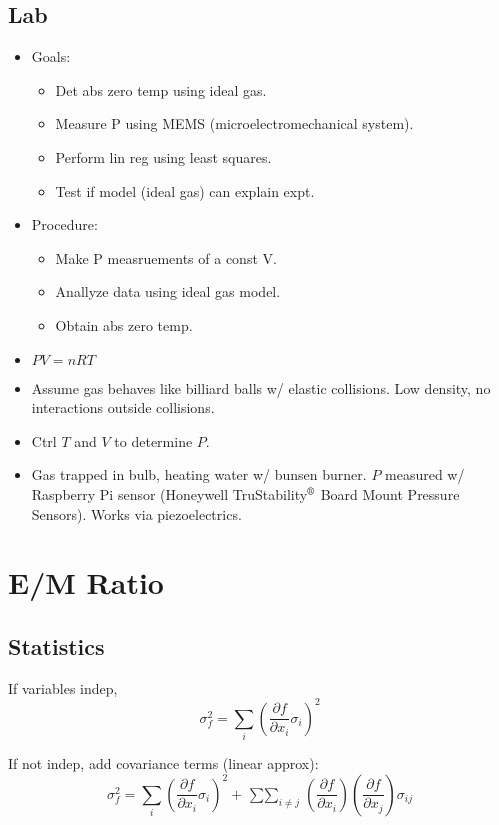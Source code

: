 \documentclass[twocolumn]{article}
\begin{document}
\subsection{Lab}

\begin{itemize}
    \item Goals:
    \begin{itemize}
        \item Det abs zero temp using ideal gas.
        \item Measure P using MEMS (microelectromechanical system).
        \item Perform lin reg using least squares.
        \item Test if model (ideal gas) can explain expt.
    \end{itemize}
    \item Procedure:
    \begin{itemize}
        \item Make P measruements of a const V.
        \item Anallyze data using ideal gas model.
        \item Obtain abs zero temp.
    \end{itemize}
    \item $PV = nRT$
    \item Assume gas behaves like billiard balls w/ elastic collisions. Low density, no interactions outside collisions.
    \item Ctrl $T$ and $V$ to determine $P$.
    \item Gas trapped in bulb, heating water w/ bunsen burner. $P$ measured w/ Raspberry Pi sensor (Honeywell TruStability$^\text{\textregistered}$ Board Mount Pressure Sensors). Works via piezoelectrics.
\end{itemize}


\section{E/M Ratio}

\subsection{Statistics}
If variables indep,
\begin{equation*}
    \sigma_f^2 = \sum_i \left( \frac{\partial f}{\partial x_i} \sigma_i \right)^2
\end{equation*}

If not indep, add covariance terms (linear approx):
\begin{equation*}
    \sigma_f^2 = \sum_i \left( \frac{\partial f}{\partial x_i} \sigma_i \right)^2 + \mathop{\sum \sum}_{i \neq j} \left( \frac{\partial f}{\partial x_i} \right) \left( \frac{\partial f}{\partial x_j} \right) \sigma_{ij}
\end{equation*}
\end{document}
